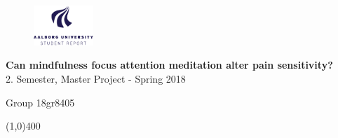 \clearpage
\thispagestyle{empty}

\begin{figure}[H]
	\raggedleft
	\includegraphics[width=0.2\textwidth]{setup/aau_logo_en.pdf}
\end{figure} 

\vspace{5 cm}

\begin{center}	
	\begin{Huge}
		\textbf{Can mindfulness focus attention meditation alter pain sensitivity?}\\
		\vspace{5 mm}
		$2.$ Semester, Master Project - Spring 2018\\
		\vspace{3 mm}
	\end{Huge}
	{\Large Group 18gr8405}
\end{center}
\vspace*{\fill}

\begin{center}
	\line(1,0){400}
\end{center}




